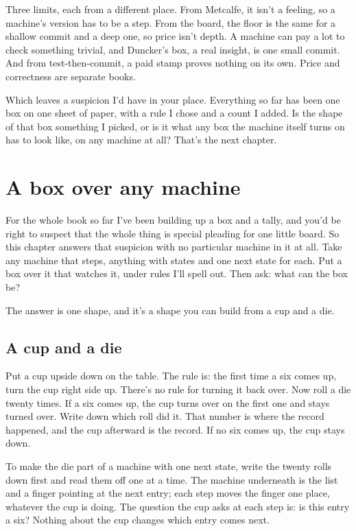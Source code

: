 \documentclass[11pt,twoside]{article}
\theoremstyle{thielethm}
\theoremstyle{thieledef}
\theoremstyle{thieledef}
\theoremstyle{thieledef}
\theoremstyle{thielethm}
\theoremstyle{thieleobs}
\theoremstyle{thielethm}
\begin{document}
Three limits, each from a different place. From Metcalfe, it isn't a feeling, so a machine's version has to be a step. From the board, the floor is the same for a shallow commit and a deep one, so price isn't depth. A machine can pay a lot to check something trivial, and Duncker's box, a real insight, is one small commit. And from test-then-commit, a paid stamp proves nothing on its own. Price and correctness are separate books.

Which leaves a suspicion I'd have in your place. Everything so far has been one box on one sheet of paper, with a rule I chose and a count I added. Is the shape of that box something I picked, or is it what any box the machine itself turns on has to look like, on any machine at all? That's the next chapter.

\section{A box over any machine}
\label{sec:any-machine}

For the whole book so far I've been building up a box and a tally, and you'd be right to suspect that the whole thing is special pleading for one little board. So this chapter answers that suspicion with no particular machine in it at all. Take any machine that steps, anything with states and one next state for each. Put a box over it that watches it, under rules I'll spell out. Then ask: what can the box be?

The answer is one shape, and it's a shape you can build from a cup and a die.

\subsection{A cup and a die}

Put a cup upside down on the table. The rule is: the first time a six comes up, turn the cup right side up. There's no rule for turning it back over. Now roll a die twenty times. If a six comes up, the cup turns over on the first one and stays turned over. Write down which roll did it. That number is where the record happened, and the cup afterward is the record. If no six comes up, the cup stays down.

To make the die part of a machine with one next state, write the twenty rolls down first and read them off one at a time. The machine underneath is the list and a finger pointing at the next entry; each step moves the finger one place, whatever the cup is doing. The question the cup asks at each step is: is this entry a six? Nothing about the cup changes which entry comes next.
\end{document}
